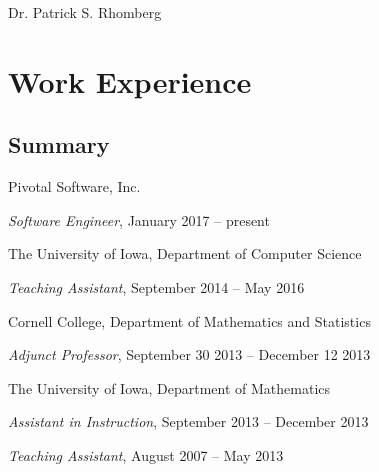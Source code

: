 \documentclass[10pt,letterpaper]{article}
\newcommand{\jobEntryTitle}[1]{\item #1}
\newcommand{\jobEntryEntry}[2]{\par\vspace{-.2em}\quad \textit{#1}, #2}
\newcommand{\jobEntry}[3]{\jobEntryTitle{#1}\jobEntryEntry{#2}{#3}}
\def\name{Dr. Patrick S. Rhomberg}
\renewenvironment{itemize}{
  \begin{list}{}{
    \setlength{\leftmargin}{1.5em}
    \setlength{\itemsep}{0.25em}
    \setlength{\parskip}{0pt}
    \setlength{\parsep}{0.25em}
  }
}{
  \end{list}
}
\begin{document}
{\huge \name}
\bigskip






\section*{Work Experience}
\subsection*{Summary}
\begin{itemize}
  \jobEntry{Pivotal Software, Inc.}{Software Engineer}{January 2017 -- present}
  \jobEntry{The University of Iowa, Department of Computer Science}{Teaching Assistant}{September 2014 -- May 2016}
  \jobEntry{Cornell College, Department of Mathematics and Statistics}{Adjunct Professor}{September 30 2013 -- December 12 2013}
  \jobEntryTitle{The University of Iowa, Department of Mathematics}
  \jobEntryEntry{Assistant in Instruction}{September 2013 -- December 2013}
  \jobEntryEntry{Teaching Assistant}{August 2007 -- May 2013}
\end{itemize}

\end{document}
